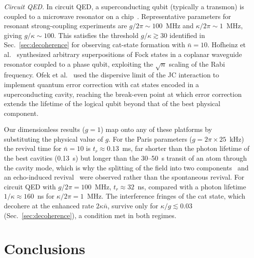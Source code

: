 \documentclass[%
 reprint,
 amsmath,amssymb,
 aps,
 floatfix,
]{revtex4-2}
\begin{document}
\textit{Circuit QED.} In circuit QED, a superconducting qubit (typically a transmon) is coupled to a microwave resonator on a chip~\cite{blais2021}. Representative parameters for resonant strong-coupling experiments are $g/2\pi \sim 100$~MHz and $\kappa/2\pi \sim 1$~MHz, giving $g/\kappa \sim 100$. This satisfies the threshold $g/\kappa \gtrsim 30$ identified in Sec.~\ref{sec:decoherence} for observing cat-state formation with $\bar{n} = 10$. Hofheinz et al.~\cite{hofheinz2009} synthesized arbitrary superpositions of Fock states in a coplanar waveguide resonator coupled to a phase qubit, exploiting the $\sqrt{n}$ scaling of the Rabi frequency. Ofek et al.~\cite{ofek2016} used the dispersive limit of the JC interaction to implement quantum error correction with cat states encoded in a superconducting cavity, reaching the break-even point at which error correction extends the lifetime of the logical qubit beyond that of the best physical component.

Our dimensionless results ($g = 1$) map onto any of these platforms by substituting the physical value of $g$. For the Paris parameters ($g = 2\pi \times 25$~kHz) the revival time for $\bar{n} = 10$ is $t_r \approx 0.13$~ms, far shorter than the photon lifetime of the best cavities (0.13~s) but longer than the 30--50~\textmu{}s transit of an atom through the cavity mode, which is why the splitting of the field into two components~\cite{auffeves2003} and an echo-induced revival~\cite{meunier2005} were observed rather than the spontaneous revival. For circuit QED with $g/2\pi = 100$~MHz, $t_r \approx 32$~ns, compared with a photon lifetime $1/\kappa \approx 160$~ns for $\kappa/2\pi = 1$~MHz. The interference fringes of the cat state, which decohere at the enhanced rate $2\kappa\bar{n}$, survive only for $\kappa/g \lesssim 0.03$ (Sec.~\ref{sec:decoherence}), a condition met in both regimes.


\section{Conclusions}
\label{sec:conclusions}
\end{document}
